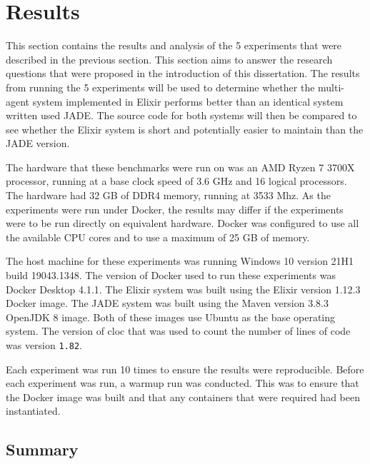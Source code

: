 \section{Results}\label{sec:results}

This section contains the results and analysis of the 5 experiments that were described in the previous section.
This section aims to answer the research questions that were proposed in the introduction of this dissertation.
The results from running the 5 experiments will be used to determine whether the multi-agent system implemented in Elixir performs better than an identical system written used JADE\@.
The source code for both systems will then be compared to see whether the Elixir system is short and potentially easier to maintain than the JADE version.

The hardware that these benchmarks were run on was an AMD Ryzen 7 3700X processor, running at a base clock speed of 3.6 GHz and 16 logical processors.
The hardware had 32 GB of DDR4 memory, running at 3533 Mhz.
As the experiments were run under Docker, the results may differ if the experiments were to be run directly on equivalent hardware.
Docker was configured to use all the available CPU cores and to use a maximum of 25 GB of memory.

The host machine for these experiments was running Windows 10 version 21H1 build 19043.1348.
The version of Docker used to run these experiments was Docker Desktop 4.1.1.
The Elixir system was built using the Elixir version 1.12.3 Docker image.
The JADE system was built using the Maven version 3.8.3 OpenJDK 8 image.
Both of these images use Ubuntu as the base operating system.
The version of cloc that was used to count the number of lines of code was version \verb|1.82|.

Each experiment was run 10 times to ensure the results were reproducible.
Before each experiment was run, a warmup run was conducted.
This was to ensure that the Docker image was built and that any containers that were required had been instantiated.









\subsection{Summary}

